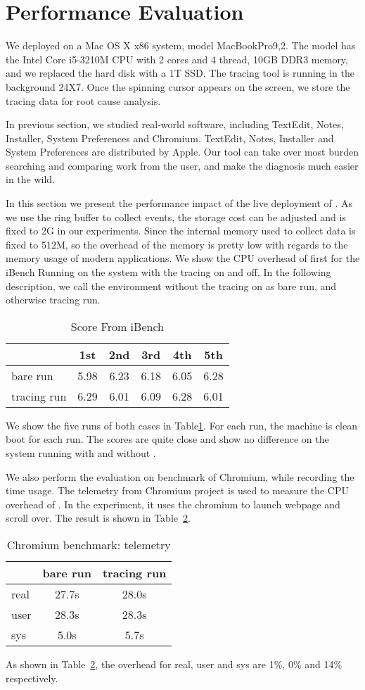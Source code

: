 \section{Performance Evaluation}
\label{sec:evaluation}
We deployed \xxx on a Mac OS X x86 system, model MacBookPro9,2.  The
model has the Intel Core i5-3210M CPU with 2 cores and 4 thread, 10GB DDR3
memory, and we replaced the hard disk with a 1T SSD. The tracing tool is
running in the background 24X7. Once the spinning cursor appears on the
screen, we store the tracing data for root cause analysis.

In previous section, we studied real-world software, including TextEdit,
Notes, Installer, System Preferences and Chromium. TextEdit, Notes, Installer and System
Preferences are distributed by Apple.  
Our tool can take over most burden searching and comparing work from the user,
and make the diagnosis much easier in the wild.

In this section we present the performance impact of the live deployment of \xxx.
As we use the ring buffer to collect events, the storage cost can be adjusted
and is fixed to 2G in our experiments.
Since the internal memory used to collect data is fixed to 512M, so the overhead of the
memory is pretty low with regards to the memory usage of modern applications.
We show the CPU overhead of \xxx first for the iBench Running on the system with the tracing
on and off. In the following description, we call the environment without the tracing on as
bare run, and otherwise tracing run.

\begin{table}[ht]
\begin{tabular}{l|c|c|c|c|c}
\hline
 & 1st & 2nd & 3rd & 4th & 5th\\
\hline
 bare run & 5.98 & 6.23 & 6.18 & 6.05 & 6.28\\
\hline
 tracing run& 6.29 & 6.01 & 6.09 & 6.28 & 6.01\\
\hline
\end{tabular}
\caption{Score From iBench}
\label{tab:ibench}
\end{table}
We show the five runs of both cases in Table\ref{tab:ibench}.
For each run, the machine is clean boot for each run.
The scores are quite close and show no difference on the system running with and without \xxx.

We also perform the evaluation on benchmark of Chromium, while recording the time usage.
The telemetry from Chromium project is used to measure the CPU overhead of \xxx.
In the experiment, it uses the chromium to launch webpage and scroll over.
The result is shown in Table~\ref{tab:chromium benchmark}. 
\begin{table}[ht]
\begin{tabular}{l|c|c}
\hline
 & bare run & tracing run \\
\hline
real & 27.7s & 28.0s \\
\hline
user & 28.3s & 28.3s \\
\hline
sys &  5.0s & 5.7s\\
\hline
\end{tabular}
\caption{Chromium benchmark: telemetry}
\label{tab:chromium benchmark}
\end{table}

As shown in Table~\ref{tab:chromium benchmark}, the overhead for real, user and sys are 1\%, 0\% and
14\% respectively.
